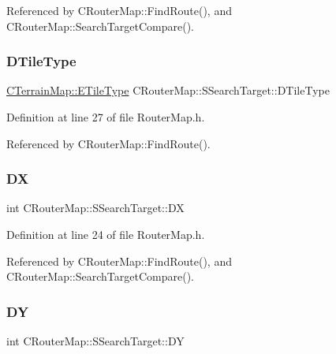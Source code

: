 Referenced by C\+Router\+Map\+::\+Find\+Route(), and C\+Router\+Map\+::\+Search\+Target\+Compare().

\hypertarget{structCRouterMap_1_1SSearchTarget_a20598a9fd12e7a87ecd920931797b269}{}\label{structCRouterMap_1_1SSearchTarget_a20598a9fd12e7a87ecd920931797b269} 
\subsubsection{\texorpdfstring{D\+Tile\+Type}{DTileType}}
{\footnotesize\ttfamily \hyperlink{classCTerrainMap_aff2ab991e237269941416dd79d8871d4}{C\+Terrain\+Map\+::\+E\+Tile\+Type} C\+Router\+Map\+::\+S\+Search\+Target\+::\+D\+Tile\+Type}



Definition at line 27 of file Router\+Map.\+h.



Referenced by C\+Router\+Map\+::\+Find\+Route().

\hypertarget{structCRouterMap_1_1SSearchTarget_a1ba72713642034425d7db39ffb2135da}{}\label{structCRouterMap_1_1SSearchTarget_a1ba72713642034425d7db39ffb2135da} 
\subsubsection{\texorpdfstring{DX}{DX}}
{\footnotesize\ttfamily int C\+Router\+Map\+::\+S\+Search\+Target\+::\+DX}



Definition at line 24 of file Router\+Map.\+h.



Referenced by C\+Router\+Map\+::\+Find\+Route(), and C\+Router\+Map\+::\+Search\+Target\+Compare().

\hypertarget{structCRouterMap_1_1SSearchTarget_adab361d87964252b68e5b5b436d1855d}{}\label{structCRouterMap_1_1SSearchTarget_adab361d87964252b68e5b5b436d1855d} 
\subsubsection{\texorpdfstring{DY}{DY}}
{\footnotesize\ttfamily int C\+Router\+Map\+::\+S\+Search\+Target\+::\+DY}



